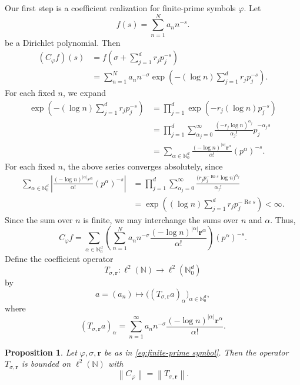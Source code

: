 \documentclass[12pt, reqno]{amsart}
\numberwithin{equation}{section}
\newtheorem{proposition}[theorem]{Proposition}
\begin{document}
Our first step is a coefficient realization for finite-prime symbols $\varphi.$ Let
\[
f(s)=\sum_{n=1}^{N}a_n n^{-s}.
\] be a Dirichlet polynomial.
Then
\[
\begin{aligned}
(C_{\varphi}f)(s)
&=
f\left(\sigma+\sum_{j=1}^{d}r_jp_j^{-s}\right)  \\
&=
\sum_{n=1}^{N}
a_n n^{-\sigma}
\exp\left(
-(\log n)\sum_{j=1}^{d}r_jp_j^{-s}
\right).
\end{aligned}
\]
For each fixed \(n\), we expand
\[
\begin{aligned}
\exp\left(
-(\log n)\sum_{j=1}^{d}r_jp_j^{-s}
\right)
&=
\prod_{j=1}^{d}
\exp\left(-r_j(\log n)p_j^{-s}\right) \\
&=
\prod_{j=1}^{d}
\sum_{\alpha_j=0}^{\infty}
\frac{(-r_j\log n)^{\alpha_j}}{\alpha_j!}p_j^{-\alpha_js} \\
&=
\sum_{\alpha\in\mathbb{N}_{0}^{d}}
\frac{(-\log n)^{|\alpha|}\boldsymbol{r}^{\alpha}}{\alpha!}
(p^{\alpha})^{-s}.
\end{aligned}
\]
For each fixed $n$, the above series converges absolutely, since
\[
\begin{aligned}
\sum_{\alpha\in\mathbb N_0^d}
\left|
\frac{(-\log n)^{|\alpha|}r^\alpha}{\alpha!}
(p^\alpha)^{-s}
\right|
&=
\prod_{j=1}^d
\sum_{\alpha_j=0}^{\infty}
\frac{\big(r_jp_j^{-\operatorname{Re}s}\log n\big)^{\alpha_j}}
{\alpha_j!}\\
&=
\exp\left((\log n)\sum_{j=1}^d
r_jp_j^{-\operatorname{Re}s}\right)
<\infty.
\end{aligned}
\]
Since the sum over $n$ is finite, we may interchange the sums over
$n$ and $\alpha$. Thus,
\begin{equation}\label{eq: finite coefficient}
C_{\varphi}f
=
\sum_{\alpha\in\mathbb{N}_{0}^{d}}
\left(
\sum_{n=1}^{N}
a_n n^{-\sigma}
\frac{(-\log n)^{|\alpha|}\boldsymbol{r}^{\alpha}}{\alpha!}
\right)
(p^{\alpha})^{-s}.
\end{equation}
Define the coefficient operator
\[
T_{\sigma,\boldsymbol{r}}:\ell^2(\mathbb{N})\longrightarrow\ell^2(\mathbb{N}_{0}^{d})
\]
 by \[ a=( a_n) \mapsto \bigl((T_{\sigma,\boldsymbol r}a)_\alpha\bigr)_{
\alpha\in\mathbb N_0^d},\]  where
\[
(T_{\sigma,\boldsymbol{r}}a)_{\alpha}
=
\sum_{n=1}^{\infty}
a_n n^{-\sigma}
\frac{(-\log n)^{|\alpha|}\boldsymbol{r}^{\alpha}}{\alpha!}.
\]


\begin{proposition}
\label{prop:fp-coefficient-realization}
Let $\varphi,\sigma,\boldsymbol{r}$ be as in \eqref{eq:finite-prime symbol}. Then the operator \(T_{\sigma,\boldsymbol{r}}\) is  bounded on $\ell^2(\mathbb{N})$ with
\[
\left\|C_{\varphi}\right\|
=
\left\|T_{\sigma,\boldsymbol{r}}\right\|.
\]
\end{proposition}
\end{document}
